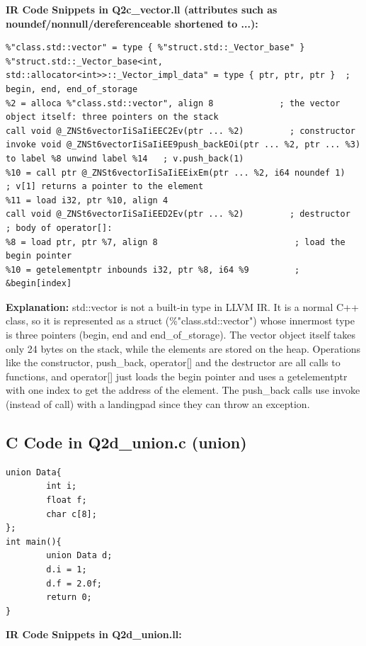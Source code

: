 \medskip\noindent\textbf{IR Code Snippets in Q2c\_vector.ll (attributes such as noundef/nonnull/dereferenceable shortened to ...):}\par

\begin{lstlisting}
%"class.std::vector" = type { %"struct.std::_Vector_base" }
%"struct.std::_Vector_base<int, std::allocator<int>>::_Vector_impl_data" = type { ptr, ptr, ptr }  ; begin, end, end_of_storage
%2 = alloca %"class.std::vector", align 8             ; the vector object itself: three pointers on the stack
call void @_ZNSt6vectorIiSaIiEEC2Ev(ptr ... %2)         ; constructor
invoke void @_ZNSt6vectorIiSaIiEE9push_backEOi(ptr ... %2, ptr ... %3) to label %8 unwind label %14   ; v.push_back(1)
%10 = call ptr @_ZNSt6vectorIiSaIiEEixEm(ptr ... %2, i64 noundef 1)   ; v[1] returns a pointer to the element
%11 = load i32, ptr %10, align 4
call void @_ZNSt6vectorIiSaIiEED2Ev(ptr ... %2)         ; destructor
; body of operator[]:
%8 = load ptr, ptr %7, align 8                           ; load the begin pointer
%10 = getelementptr inbounds i32, ptr %8, i64 %9         ; &begin[index]
\end{lstlisting}

\textbf{Explanation: }std::vector is not a built-in type in LLVM IR. It is a normal C++ class, so it is represented as a struct (\%"class.std::vector") whose innermost type is three pointers (begin, end and end\_of\_storage). The vector object itself takes only 24 bytes on the stack, while the elements are stored on the heap. Operations like the constructor, push\_back, operator[] and the destructor are all calls to functions, and operator[] just loads the begin pointer and uses a getelementptr with one index to get the address of the element. The push\_back calls use invoke (instead of call) with a landingpad since they can throw an exception.


\subsection{C Code in Q2d\_union.c (union)}

\begin{lstlisting}
union Data{
        int i;
        float f;
        char c[8];
};
int main(){
        union Data d;
        d.i = 1;
        d.f = 2.0f;
        return 0;
}
\end{lstlisting}

\medskip\noindent\textbf{IR Code Snippets in Q2d\_union.ll:}\par

